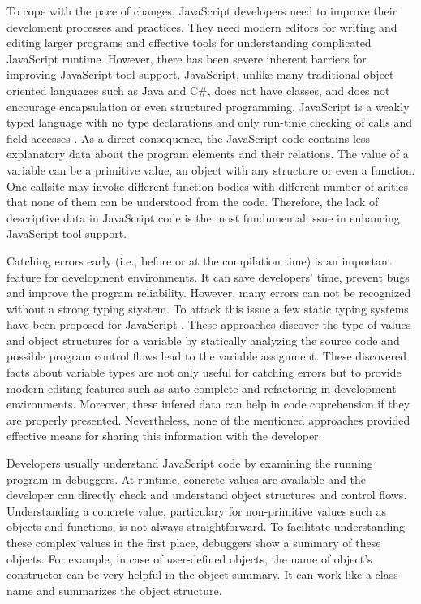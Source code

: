 \documentclass{acm_proc_article-sp}
\begin{document}
To cope with the pace of changes, JavaScript developers need to improve their develoment processes and practices. They need modern editors for writing and editing larger programs and effective tools for understanding complicated JavaScript runtime. However, there has been severe inherent barriers for improving JavaScript tool support. 
JavaScript, unlike many traditional object oriented languages such as Java and C\#, does not have classes, and does not encourage encapsulation or even structured programming. JavaScript is a weakly typed language with no type declarations and only run-time checking of calls and field accesses \cite{Richards}. As a direct consequence, the JavaScript code contains less explanatory data about the program elements and their relations. The value of a variable can be a primitive value, an object with any structure or even a function. One callsite may invoke different function bodies with different number of arities that none of them can be understood from the code. Therefore, the lack of descriptive data in JavaScript code is the most fundumental issue in enhancing JavaScript tool support.

Catching errors early (i.e., before or at the compilation time) is an important feature for development environments. It can save developers' time, prevent bugs and improve the program reliability. However, many errors can not be recognized without a strong typing stystem. To attack this issue a few static typing systems have been proposed for JavaScript \cite{Anderson, Anderson2, Heidegger, Thiemann}. These approaches discover the type of values and object structures for a variable by statically analyzing the source code and possible program control flows lead to the variable assignment. These discovered facts about variable types are not only useful for catching errors but to provide modern editing features such as auto-complete and refactoring in development environments. Moreover, these infered data can help in code coprehension if they are properly presented. Nevertheless, none of the mentioned approaches provided effective means for sharing this information with the developer. 

Developers usually understand JavaScript code by examining the running program in debuggers. At runtime, concrete values are available and the developer can directly check and understand object structures and control flows. Understanding a concrete value, particulary for non-primitive values such as objects and functions, is not always straightforward. To facilitate understanding these complex values in the first place, debuggers show a summary of these objects. For example, in case of user-defined objects, the name of object's constructor can be very helpful in the object summary. It can work like a class name and summarizes the object structure.
\end{document}
